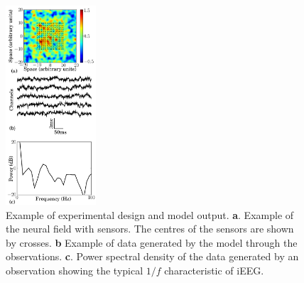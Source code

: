\documentclass[12pt]{iopart}
\begin{document}
\begin{figure}[th]\label{fig:experimental design}
   	\begin{center}
   		\includegraphics[width=0.3\textwidth]{./Graph/ExperimentFigurePy_1.pdf} 
   	\end{center}
   	\caption{Example of experimental design and model output. \textbf{a}. Example of the neural field with sensors. The centres of the sensors are shown by crosses. \textbf{b} Example of data generated by the model through the observations. \textbf{c}. Power spectral density of the data generated by an observation showing the typical $1/f$ characteristic of iEEG.} 
   \end{figure}
\end{document}
